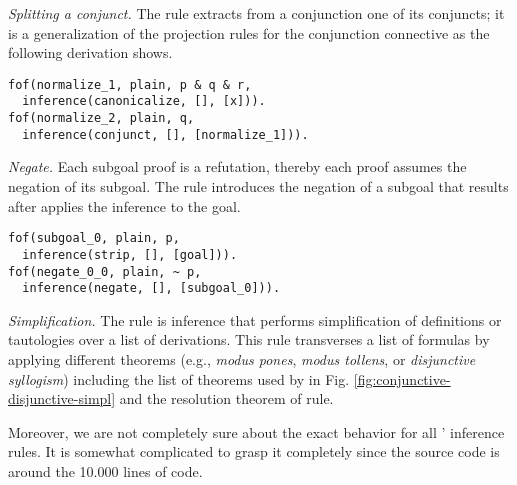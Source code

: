\documentclass[../main.tex]{subfiles}
\begin{document}

\textit{Splitting a conjunct.} The \conjunct rule extracts from a
conjunction one of its conjuncts; it is a generalization of the
projection rules for the conjunction connective as the
following \TSTP derivation shows.

\begin{verbatim}
fof(normalize_1, plain, p & q & r,
  inference(canonicalize, [], [x])).
fof(normalize_2, plain, q,
  inference(conjunct, [], [normalize_1])).
\end{verbatim}

\textit{Negate.}
Each subgoal proof is a refutation, thereby each proof assumes
the negation of its subgoal. The \negate rule
introduces the negation of a subgoal that results
after applies the \strip inference to the goal.

\begin{verbatim}
fof(subgoal_0, plain, p,
  inference(strip, [], [goal])).
fof(negate_0_0, plain, ~ p,
  inference(negate, [], [subgoal_0])).
\end{verbatim}


\textit{Simplification.}
The \simplify rule is inference that performs simplification of
definitions or tautologies over a list of derivations. This rule
transverses a list of formulas by applying different theorems (e.g.,
\emph{modus pones}, \emph{modus tollens}, or \emph{disjunctive
syllogism}) including the list of theorems used by \canonicalize in
Fig. \ref{fig:conjunctive-disjunctive-simpl} and the resolution
theorem of \resolve rule.

Moreover, we are not completely sure about the exact behavior for
all \Metis' inference rules. It is somewhat complicated to grasp it
completely since the source code is around the 10.000 lines of code.
\end{document}
